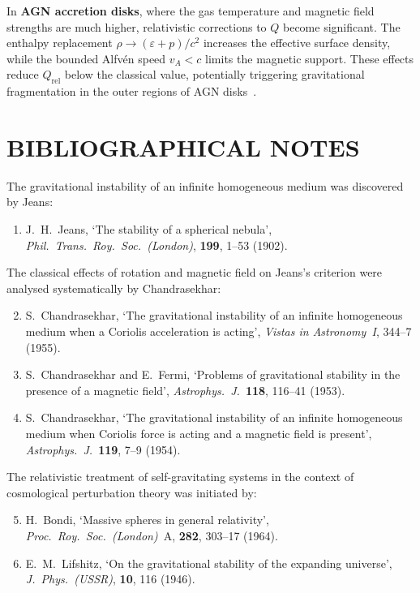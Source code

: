 In \textbf{AGN accretion disks}, where the gas temperature and
magnetic field strengths are much higher, relativistic corrections
to $Q$ become significant.  The enthalpy replacement
$\rho \to (\varepsilon + p)/c^{2}$ increases the effective surface
density, while the bounded Alfv\'en speed $v_{A} < c$ limits the
magnetic support.  These effects reduce $Q_{\mathrm{rel}}$ below
the classical value, potentially triggering gravitational
fragmentation in the outer regions of AGN
disks~\citep{RezzollaZanotti2013}.

\section*{BIBLIOGRAPHICAL NOTES}
\label{sec:rel-120-bib}

The gravitational instability of an infinite homogeneous medium was
discovered by Jeans:

\begin{enumerate}
\item J.~H.~Jeans, `The stability of a spherical nebula',
  \textit{Phil.\ Trans.\ Roy.\ Soc.\ (London)}, \textbf{199}, 1--53
  (1902).
\end{enumerate}

\noindent
The classical effects of rotation and magnetic field on Jeans's
criterion were analysed systematically by Chandrasekhar:

\begin{enumerate}
\setcounter{enumi}{1}
\item S.~Chandrasekhar, `The gravitational instability of an infinite
  homogeneous medium when a Coriolis acceleration is acting',
  \textit{Vistas in Astronomy~I}, 344--7 (1955).
\item S.~Chandrasekhar and E.~Fermi, `Problems of gravitational
  stability in the presence of a magnetic field',
  \textit{Astrophys.\ J.}\ \textbf{118}, 116--41 (1953).
\item S.~Chandrasekhar, `The gravitational instability of an infinite
  homogeneous medium when Coriolis force is acting and a magnetic
  field is present', \textit{Astrophys.\ J.}\ \textbf{119}, 7--9
  (1954).
\end{enumerate}

\noindent
The relativistic treatment of self-gravitating systems in the context of
cosmological perturbation theory was initiated by:

\begin{enumerate}
\setcounter{enumi}{4}
\item H.~Bondi, `Massive spheres in general relativity',
  \textit{Proc.\ Roy.\ Soc.\ (London)}~A, \textbf{282}, 303--17
  (1964).
\item E.~M.~Lifshitz, `On the gravitational stability of the expanding
  universe', \textit{J.\ Phys.\ (USSR)}, \textbf{10}, 116 (1946).
\end{enumerate}

